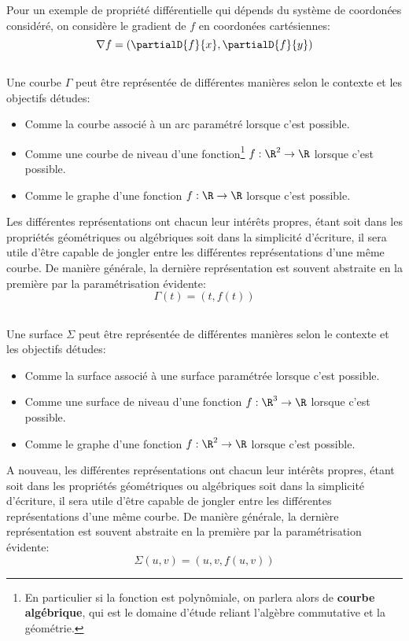 Pour un exemple de propriété différentielle qui dépends du système de coordonées considéré, on considère le gradient de \(f\) en coordonées cartésiennes:
\[
   \nabla f = \left(\partialD{f}{x}, \partialD{f}{y}\right) 
\]

\subsection*{}
Une courbe \(\Gamma\) peut être représentée de différentes manières selon le contexte et les objectifs détudes:
\begin{itemize}
   \item Comme la courbe associé à un arc paramétré lorsque c'est possible.
   \item Comme une courbe de niveau d'une fonction\footnote[1]{En particulier si la fonction est polynômiale, on parlera alors de \textbf{courbe algébrique}, qui est le domaine d'étude reliant l'algèbre commutative et la géométrie.} \(f : \R^2 \rightarrow \R\) lorsque c'est possible.
   \item Comme le graphe d'une fonction \(f : \R \rightarrow \R\) lorsque c'est possible.
\end{itemize}
Les différentes représentations ont chacun leur intérêts propres, étant soit dans les propriétés géométriques ou algébriques soit dans la simplicité d'écriture, il sera utile d'être capable de jongler entre les différentes représentations d'une même courbe. De manière générale, la dernière représentation est souvent abstraite en la première par la paramétrisation évidente:
\[
   \Gamma(t) = (t, f(t))
\]

\subsection*{}
Une surface \(\Sigma\) peut être représentée de différentes manières selon le contexte et les objectifs détudes:
\begin{itemize}
   \item Comme la surface associé à une surface paramétrée lorsque c'est possible.
   \item Comme une surface de niveau d'une fonction \(f : \R^3 \rightarrow \R\) lorsque c'est possible.
   \item Comme le graphe d'une fonction \(f : \R^2 \rightarrow \R\) lorsque c'est possible.
\end{itemize}
A nouveau, les différentes représentations ont chacun leur intérêts propres, étant soit dans les propriétés géométriques ou algébriques soit dans la simplicité d'écriture, il sera utile d'être capable de jongler entre les différentes représentations d'une même courbe. De manière générale, la dernière représentation est souvent abstraite en la première par la paramétrisation évidente:
\[
   \Sigma(u, v) = (u, v, f(u, v))
\]

